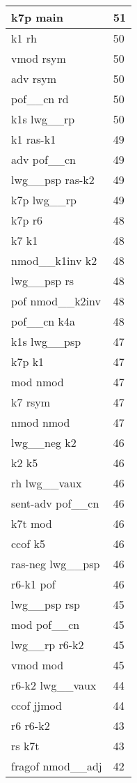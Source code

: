 \documentclass[a4 paper]{article}
\begin{document}
\begin{longtable}{p{}p{}}
k7p main  & 51 \\ \midrule
k1 rh  & 50 \\ \midrule
vmod rsym  & 50 \\ \midrule
adv rsym  & 50 \\ \midrule
pof\_\_cn rd  & 50 \\ \midrule
k1s lwg\_\_rp  & 50 \\ \midrule
k1 ras-k1  & 49 \\ \midrule
adv pof\_\_cn  & 49 \\ \midrule
lwg\_\_psp ras-k2  & 49 \\ \midrule
k7p lwg\_\_rp  & 49 \\ \midrule
k7p r6  & 48 \\ \midrule
k7 k1  & 48 \\ \midrule
nmod\_\_k1inv k2  & 48 \\ \midrule
lwg\_\_psp rs  & 48 \\ \midrule
pof nmod\_\_k2inv  & 48 \\ \midrule
pof\_\_cn k4a  & 48 \\ \midrule
k1s lwg\_\_psp  & 47 \\ \midrule
k7p k1  & 47 \\ \midrule
mod nmod  & 47 \\ \midrule
k7 rsym  & 47 \\ \midrule
nmod nmod  & 47 \\ \midrule
lwg\_\_neg k2  & 46 \\ \midrule
k2 k5  & 46 \\ \midrule
rh lwg\_\_vaux  & 46 \\ \midrule
sent-adv pof\_\_cn  & 46 \\ \midrule
k7t mod  & 46 \\ \midrule
ccof k5  & 46 \\ \midrule
ras-neg lwg\_\_psp  & 46 \\ \midrule
r6-k1 pof  & 46 \\ \midrule
lwg\_\_psp rsp  & 45 \\ \midrule
mod pof\_\_cn  & 45 \\ \midrule
lwg\_\_rp r6-k2  & 45 \\ \midrule
vmod mod  & 45 \\ \midrule
r6-k2 lwg\_\_vaux  & 44 \\ \midrule
ccof jjmod  & 44 \\ \midrule
r6 r6-k2  & 43 \\ \midrule
rs k7t  & 43 \\ \midrule
fragof nmod\_\_adj  & 42 \\ \midrule

\end{longtable}
\end{document}
